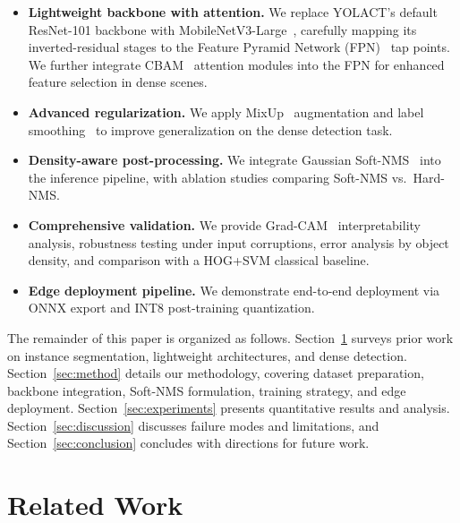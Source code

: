 \documentclass[conference]{IEEEtran}
\begin{document}
\begin{itemize}
  \item \textbf{Lightweight backbone with attention.} We replace YOLACT's
        default ResNet-101 backbone with MobileNetV3-Large~\cite{howard2019mobilenetv3},
        carefully mapping its inverted-residual stages to the
        Feature Pyramid Network (FPN)~\cite{lin2017fpn} tap points.
        We further integrate CBAM~\cite{woo2018cbam} attention modules
        into the FPN for enhanced feature selection in dense scenes.
  \item \textbf{Advanced regularization.} We apply MixUp~\cite{zhang2018mixup}
        augmentation and label smoothing~\cite{szegedy2016rethinking}
        to improve generalization on the dense detection task.
  \item \textbf{Density-aware post-processing.} We integrate Gaussian
        Soft-NMS~\cite{bodla2017soft} into the inference pipeline,
        with ablation studies comparing Soft-NMS vs.\ Hard-NMS.
  \item \textbf{Comprehensive validation.} We provide Grad-CAM~\cite{selvaraju2017gradcam}
        interpretability analysis, robustness testing under input
        corruptions, error analysis by object density, and comparison
        with a HOG+SVM classical baseline.
  \item \textbf{Edge deployment pipeline.} We demonstrate end-to-end
        deployment via ONNX export and INT8 post-training quantization.
\end{itemize}

The remainder of this paper is organized as follows.
Section~\ref{sec:related} surveys prior work on instance segmentation,
lightweight architectures, and dense detection.
Section~\ref{sec:method} details our methodology, covering dataset
preparation, backbone integration, Soft-NMS formulation, training
strategy, and edge deployment. Section~\ref{sec:experiments} presents
quantitative results and analysis. Section~\ref{sec:discussion}
discusses failure modes and limitations, and Section~\ref{sec:conclusion}
concludes with directions for future work.

\section{Related Work}
\label{sec:related}
\end{document}
